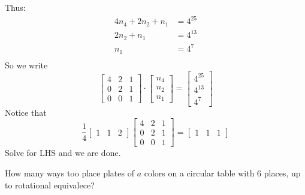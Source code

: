 \documentclass[12pt]{article}
\begin{document}
Thus: \begin{align*}
    4n_4+2n_2+n_1&=4^{25}\\
    2n_2+n_1&=4^{13}\\
    n_1&=4^{7}\\
\end{align*}
So we write \[\begin{bmatrix}
    4&2&1\\0&2&1\\0&0&1
\end{bmatrix}\cdot \begin{bmatrix}
    n_4\\n_2\\n_1
\end{bmatrix} = \begin{bmatrix}
    4^{25}\\4^{13}\\4^{7}
\end{bmatrix}\]
Notice that \[\frac{1}{4}\begin{bmatrix}
    1&1&2
\end{bmatrix}\begin{bmatrix}
    4&2&1\\0&2&1\\0&0&1
\end{bmatrix} =  \begin{bmatrix}
    1&1&1
\end{bmatrix}\]
Solve for LHS and we are done.

\eg How many ways too place plates of $a$ colors on a circular table with 6 places, up to rotational equivalece?
\end{document}
